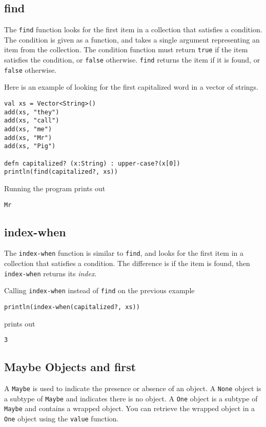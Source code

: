 \documentclass[10pt,oneside]{book}
\begin{document}
\subsection*{find}
The \texttt{\frenchspacing find} function looks for the first item in a collection that satisfies a condition. The condition is given as a function, and takes a single argument representing an item from the collection. The condition function must return \texttt{\frenchspacing true} if the item satisfies the condition, or \texttt{\frenchspacing false} otherwise. \texttt{\frenchspacing find} returns the item if it is found, or \texttt{\frenchspacing false} otherwise. 

Here is an example of looking for the first capitalized word in a vector of strings.
\begin{lstlisting}
val xs = Vector<String>()
add(xs, "they")
add(xs, "call")
add(xs, "me")
add(xs, "Mr")
add(xs, "Pig")

defn capitalized? (x:String) : upper-case?(x[0])
println(find(capitalized?, xs))
\end{lstlisting}
Running the program prints out
\begin{lstlisting}
Mr
\end{lstlisting}

\subsection*{index-when}
The \texttt{\frenchspacing index-when} function is similar to \texttt{\frenchspacing find}, and looks for the first item in a collection that satisfies a condition. The difference is if the item is found, then \texttt{\frenchspacing index-when} returns its {\em index}. 

Calling \texttt{\frenchspacing index-when} instead of \texttt{\frenchspacing find} on the previous example
\begin{lstlisting}
println(index-when(capitalized?, xs))
\end{lstlisting}
prints out
\begin{lstlisting}
3
\end{lstlisting}

\subsection*{Maybe Objects and first}
A \texttt{\frenchspacing Maybe} is used to indicate the presence or absence of an object. A \texttt{\frenchspacing None} object is a subtype of \texttt{\frenchspacing Maybe} and indicates there is no object. A \texttt{\frenchspacing One} object is a subtype of \texttt{\frenchspacing Maybe} and contains a wrapped object. You can retrieve the wrapped object in a \texttt{\frenchspacing One} object using the \texttt{\frenchspacing value} function.
\end{document}
